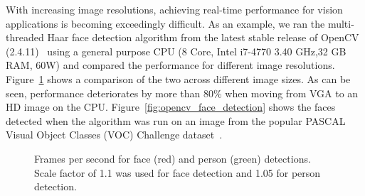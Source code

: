 With increasing image resolutions, achieving real-time performance for vision applications is becoming exceedingly difficult. 
As an example, we ran the multi-threaded Haar face detection algorithm from the latest 
stable release of OpenCV (2.4.11)~\cite{OpenCV} using 
a general purpose CPU (8 Core, Intel i7-4770 3.40 GHz,32 GB RAM, 60W) and compared the performance 
for different image resolutions.
Figure~\ref{fig:face_fps} shows a comparison of the two across different image sizes.
As can be seen, performance deteriorates by more than 80\% when moving from VGA to an HD image on the CPU.
Figure~\ref{fig:opencv_face_detection} shows the faces detected when the algorithm was run on an image 
from the popular PASCAL Visual Object Classes (VOC) Challenge dataset~\cite{Everingham2010}.

\begin{figure}[!htb]
\centering
{}
\caption{Frames per second for face (red) and person (green) detections. Scale factor of 1.1 was used for face detection and 1.05 for person detection.}
\label{fig:face_fps}
\end{figure}

